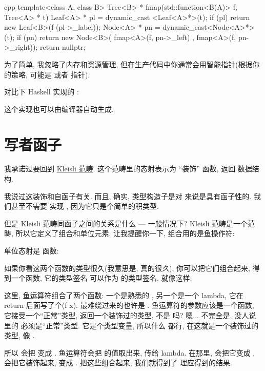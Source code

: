 \begin{snip}{cpp}
template<class A, class B>
Tree<B> * fmap(std::function<B(A)> f, Tree<A> * t) {
    Leaf<A> * pl = dynamic_cast <Leaf<A>*>(t);
    if (pl)
        return new Leaf<B>(f (pl->_label));
    Node<A> * pn = dynamic_cast<Node<A>*>(t);
    if (pn)
        return new Node<B>( fmap<A>(f, pn->_left)
                          , fmap<A>(f, pn->_right));
    return nullptr;
}
\end{snip}
为了简单, 我忽略了内存和资源管理, 但在生产代码中你通常会用智能指针(根据你的策略, 可能是  或者
 指针).

对比下 Haskell 实现的 :

这个实现也可以由编译器自动生成.

\section{写者函子}

我承诺过要回到 \hyperref[kleisli-categories]{Kleisli 范畴}. 这个范畴里的态射表示为 ``装饰'' 函数,
返回  数据结构.

我说过这装饰和自函子有关. 而且, 确实,  类型构造子是对  来说是具有函子性的. 我们甚至不需要
实现 , 因为它只是个简单的积类型.

但是 Kleisli 范畴同函子之间的关系是什么 --- 一般情况下? Kleisli 范畴是一个范畴, 所以它定义了组合和单位元素.
让我提醒你一下, 组合用的是鱼操作符:

单位态射是  函数:

如果你看这两个函数的类型很久(我意思是, 真的很\emph{久}), 你可以把它们组合起来, 得到一个函数, 它的类型签名
可以作为  的类型签名. 就像这样:

这里, 鱼运算符组合了两个函数: 一个是熟悉的 , 另一个是一个 lambda, 它在 return 后面写了个(f x).
最难绕过来的也许是 . 鱼运算符的参数应该是一个函数, 它接受一个``正常''类型, 返回一个装饰过的类型, 不是
吗? 嗯... 不完全是, 没人说  里的  必须是``正常''类型. 它是个类型变量, 所以什么
都行, 在这就是一个装饰过的类型, 像 .

所以  会把  变成 . 鱼运算符会把  的值取出来, 传给 lambda.
在那里,  会把它变成 ,  会把它装饰起来, 变成 . 把这些组合起来,
我们就得到了  理应得到的结果.

